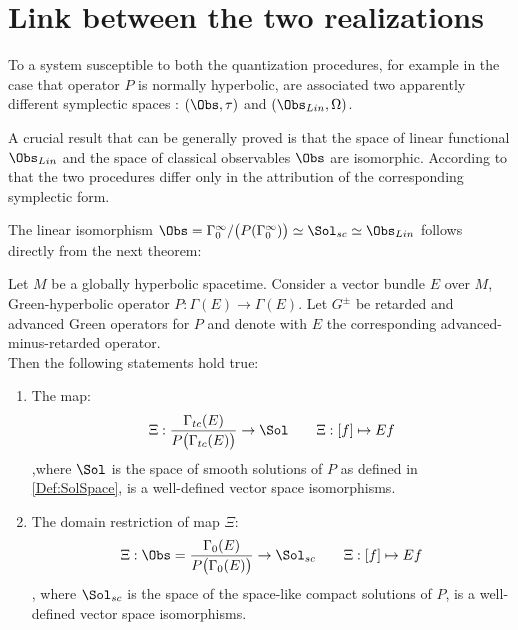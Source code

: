 \documentclass[Main]{subfiles}
\begin{document}
\section{Link between the two realizations}	
	To a system susceptible to both the quantization procedures, for example in the case that operator $P$ is normally hyperbolic, are associated two apparently different symplectic spaces : $(\Obs,\tau)$ and $(\Obs_{Lin},\Omega)$.
	
	A crucial result that can be generally proved is that the space of linear functional $\Obs_{Lin}$ and the space of classical observables $\Obs$ are isomorphic.
	According to that the two procedures differ only in the attribution of the corresponding symplectic form.

	The linear isomorphism $\Obs = \Gamma_0^\infty / \big( P ( \Gamma_0^\infty) \big) \simeq \Sol_{sc} \simeq \Obs_{Lin}$ follows directly from the next theorem:
	\begin{theorem}
					Let $M$ be a globally hyperbolic spacetime. Consider a vector bundle $E$ over $M$, Green-hyperbolic operator $P: \Gamma(E)\rightarrow \Gamma(E)$.
				Let $G^\pm$ be retarded and advanced Green operators for $P$ and denote with $E$ the corresponding advanced-minus-retarded operator.\\
				Then the following statements hold true:
					\begin{enumerate}
						\item The map:
							\begin{equation}
								 \Xi : \frac{\Gamma_{tc}(E)}{P \big( \Gamma_{tc}(E)\big)} \rightarrow  \Sol \qquad \Xi: [f] \mapsto E f
							\end{equation}
							,where $\Sol$ is the space of smooth solutions of $P$ as defined in \ref{Def:SolSpace},
							is a well-defined vector space isomorphisms.
						\item The domain restriction of map $\Xi$:
							\begin{equation}
								 \Xi : \Obs= \frac{\Gamma_{0}(E)}{P \big( \Gamma_{0}(E)\big)} \rightarrow  \Sol_{sc} \qquad \Xi: [f] \mapsto E f
							\end{equation}
							, where $\Sol_{sc}$ is the space of the space-like compact solutions of $P$,
							is a well-defined vector space isomorphisms.
					\end{enumerate}
	\end{theorem}
\end{document}
